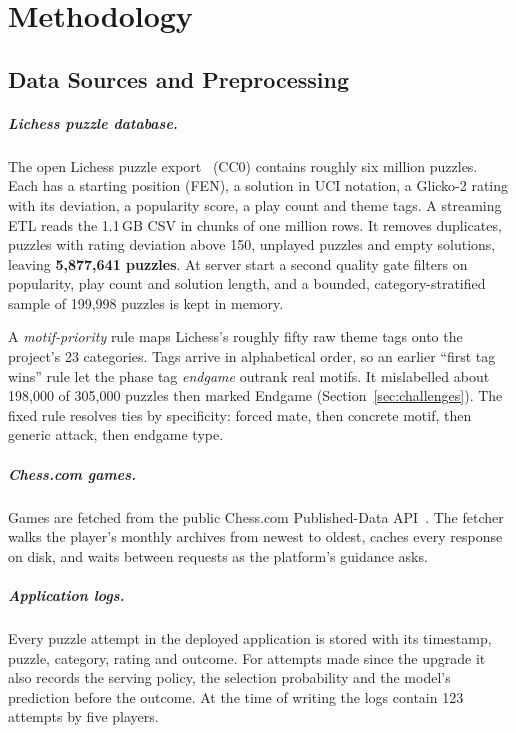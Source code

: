 \chapter{Methodology}\label{ch:method}

\section{Data Sources and Preprocessing}\label{sec:data}

\paragraph{Lichess puzzle database.} The open Lichess puzzle export~\cite{lichessdb} (CC0) contains
roughly six million puzzles. Each has a starting position (FEN), a solution in UCI notation, a
Glicko-2 rating with its deviation, a popularity score, a play count and theme tags. A streaming ETL
reads the 1.1\,GB CSV in chunks of one million rows. It removes duplicates, puzzles with rating
deviation above 150, unplayed puzzles and empty solutions, leaving \textbf{5,877,641 puzzles}. At
server start a second quality gate filters on popularity, play count and solution length, and a
bounded, category-stratified sample of 199,998 puzzles is kept in memory.

A \emph{motif-priority} rule maps Lichess's roughly fifty raw theme tags onto the project's 23
categories. Tags arrive in alphabetical order, so an earlier ``first tag wins'' rule let the phase tag
\emph{endgame} outrank real motifs. It mislabelled about 198,000 of 305,000 puzzles then marked
Endgame (Section~\ref{sec:challenges}). The fixed rule resolves ties by specificity: forced mate,
then concrete motif, then generic attack, then endgame type.

\paragraph{Chess.com games.} Games are fetched from the public Chess.com Published-Data
API~\cite{chesscomapi}. The fetcher walks the player's monthly archives from newest to oldest,
caches every response on disk, and waits between requests as the platform's guidance asks.

\paragraph{Application logs.} Every puzzle attempt in the deployed application is stored with its
timestamp, puzzle, category, rating and outcome. For attempts made since the upgrade it also records
the serving policy, the selection probability and the model's prediction before the outcome. At the
time of writing the logs contain 123 attempts by five players.

